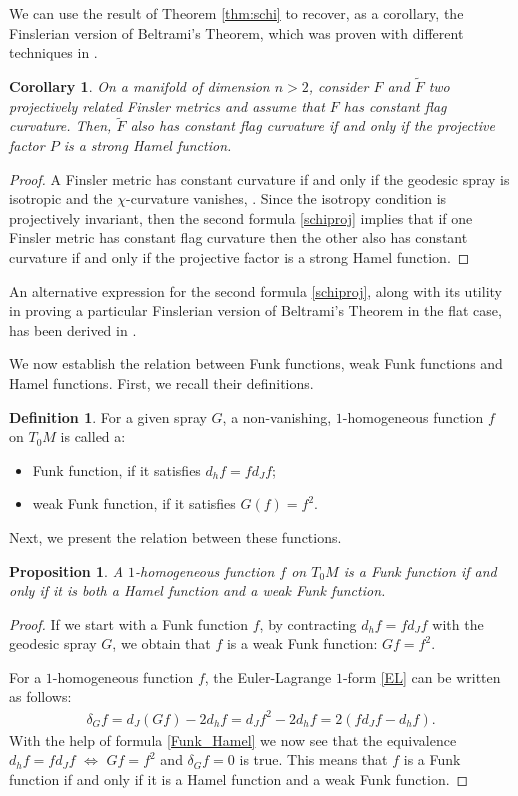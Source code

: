 \documentclass[oneside,english]{amsart}
\theoremstyle{definition}
\newtheorem{definition}[theorem]{Definition}
\theoremstyle{plain}
\theoremstyle{plain}
\newtheorem{prop}[theorem]{Proposition}
\theoremstyle{plain}
\newtheorem{cor}[theorem]{Corollary}
\theoremstyle{remark}
\theoremstyle{remark}
\theoremstyle{remark}
\begin{document}
We can use the result of Theorem \ref{thm:schi} to recover, as a corollary, the Finslerian version of Beltrami's Theorem, which was proven with different techniques in \cite{BC20a, BC20b}.
\begin{cor}
On a manifold of dimension $n>2$, consider $F$ and $\widetilde{F}$ two projectively related Finsler metrics and assume that $F$ has constant flag curvature. Then, $\widetilde{F}$ also has constant flag curvature if and only if the projective factor $P$ is a strong Hamel function.
\end{cor}
\begin{proof}
A Finsler metric has constant curvature if and only if the geodesic spray is isotropic and the $\chi$-curvature vanishes, \cite{LS18}.  Since the isotropy condition is projectively invariant, then the second formula \eqref{schiproj} implies that if one Finsler metric has constant flag curvature then the other also has constant curvature if and only if the projective factor is a strong Hamel function.
\end{proof}
An alternative expression for the second formula \eqref{schiproj}, along with its utility in proving a particular Finslerian version of Beltrami's Theorem in the flat case, has been derived in \cite[Proposition 1.1, Theorem 1.2]{CCQ22}.

We now establish the relation between Funk functions, weak Funk functions and Hamel functions. First, we recall their definitions.
\begin{definition}
For a given spray $G$, a non-vanishing, $1$-homogeneous function $f$ on $T_0M$ is called a:
\begin{itemize}
\item[i)] Funk function, if it satisfies $d_hf=fd_Jf$;
\item[ii)] weak Funk function, if it satisfies $G(f)=f^2$.
\end{itemize} 
\end{definition}
Next, we present the relation between these functions.
\begin{prop} \label{lem:FunkHamel}
A $1$-homogeneous function $f$ on $T_0M$ is a Funk function if and only if it is both a Hamel function and a weak Funk function.
\end{prop}
\begin{proof} 
If we start with a Funk function $f$, by contracting $d_hf=fd_Jf$ with the geodesic spray $G$, we obtain that $f$ is a weak Funk function: $Gf=f^2$. 

For a $1$-homogeneous function $f$, the Euler-Lagrange $1$-form \eqref{EL} can be written as follows:
\begin{eqnarray}
\delta_Gf=d_J(Gf)-2d_hf=d_Jf^2-2d_hf=2(fd_Jf-d_hf). \label{Funk_Hamel}
\end{eqnarray}
With the help of formula \eqref{Funk_Hamel} we now see that the equivalence $d_hf=fd_Jf$ $\Longleftrightarrow$ $Gf=f^2$ and $\delta_Gf=0$ is true. This means that $f$ is a Funk function if and only if it is a  Hamel function and a weak Funk function.   
\end{proof}
\end{document}
